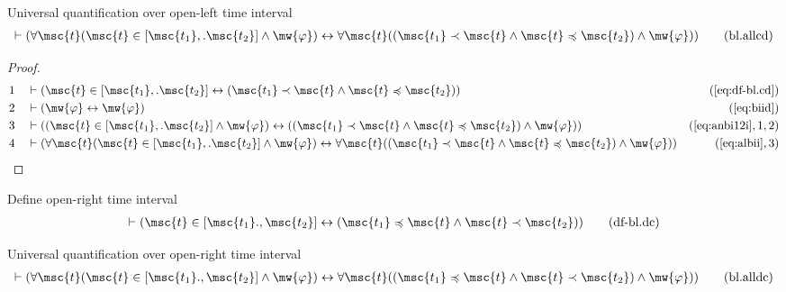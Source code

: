 \begin{lemma} Universal quantification over open-left
time interval
\begin{align}
\vdash ( \forall \msc{t} ( \msc{t} \in [ \msc{t_1} ,. \msc{t_2} ] \wedge
    \mw{\varphi} ) \leftrightarrow \forall \msc{t} ( ( \msc{t_1} \prec \msc{t}
    \wedge \msc{t} \preccurlyeq \msc{t_2} ) \wedge \mw{\varphi} )
    )\label{eq:bl.allcd}\tag{bl.allcd}
\end{align}
\end{lemma}


\begin{proof}
\begin{align}
  1 &&  & \vdash ( \msc{t} \in [ \msc{t_1} ,. \msc{t_2} ] \leftrightarrow (
     \msc{t_1} \prec \msc{t} \wedge \msc{t} \preccurlyeq
     \msc{t_2} ) )&(\mbox{\ref{eq:df-bl.cd}})\notag
  \\ 2 &&  & \vdash ( \mw{\varphi} \leftrightarrow \mw{\varphi}
     )&(\mbox{\ref{eq:biid}})\notag
  \\ 3 &&  & \vdash ( ( \msc{t} \in [ \msc{t_1} ,. \msc{t_2} ] \wedge
     \mw{\varphi} ) \leftrightarrow ( ( \msc{t_1} \prec
     \msc{t} \wedge \msc{t} \preccurlyeq \msc{t_2} )
     \wedge \mw{\varphi} )
     )&(\mbox{\ref{eq:anbi12i}},1,2)\notag
  \\ 4 &&  & \vdash ( \forall \msc{t} ( \msc{t} \in [ \msc{t_1} ,. \msc{t_2} ]
     \wedge \mw{\varphi} ) \leftrightarrow \forall \msc{t}
     ( ( \msc{t_1} \prec \msc{t} \wedge \msc{t}
     \preccurlyeq \msc{t_2} ) \wedge \mw{\varphi} )
     )&(\mbox{\ref{eq:albii}},3)\notag
\end{align}
\end{proof}

\begin{metadefinition} {Define open-right time interval}
\begin{align}
\vdash ( \msc{t} \in [ \msc{t_1} ., \msc{t_2} ] \leftrightarrow ( \msc{t_1}
    \preccurlyeq \msc{t} \wedge \msc{t} \prec \msc{t_2} )
    )\label{eq:df-bl.dc}\tag{df-bl.dc}
\end{align}
\end{metadefinition}


\begin{lemma} {Universal quantification over open-right
time interval}
\begin{align}
\vdash ( \forall \msc{t} ( \msc{t} \in [ \msc{t_1} ., \msc{t_2} ] \wedge
    \mw{\varphi} ) \leftrightarrow \forall \msc{t} ( ( \msc{t_1} \preccurlyeq
    \msc{t} \wedge \msc{t} \prec \msc{t_2} ) \wedge \mw{\varphi} )
    )\label{eq:bl.alldc}\tag{bl.alldc}
\end{align}
\end{lemma}


